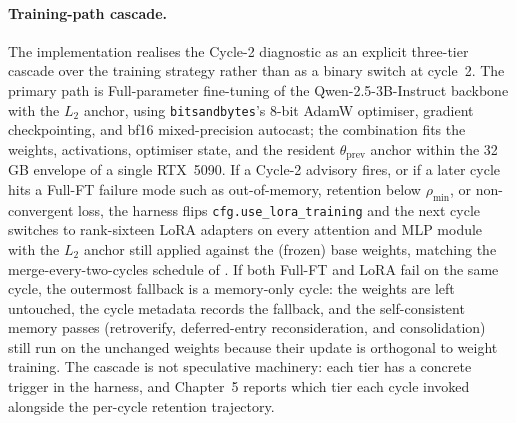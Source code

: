\paragraph{Training-path cascade.}
The implementation realises the Cycle-2 diagnostic as an explicit three-tier cascade over the training strategy rather than as a binary switch at cycle~2. The primary path is Full-parameter fine-tuning of the Qwen-2.5-3B-Instruct backbone with the $L_{2}$ anchor, using \texttt{bitsandbytes}'s 8-bit AdamW optimiser, gradient checkpointing, and bf16 mixed-precision autocast; the combination fits the weights, activations, optimiser state, and the resident $\theta_{\text{prev}}$ anchor within the 32\,GB envelope of a single RTX~5090. If a Cycle-2 advisory fires, or if a later cycle hits a Full-FT failure mode such as out-of-memory, retention below $\rho_{\min}$, or non-convergent loss, the harness flips \texttt{cfg.use\_lora\_training} and the next cycle switches to rank-sixteen LoRA adapters on every attention and MLP module with the $L_{2}$ anchor still applied against the (frozen) base weights, matching the merge-every-two-cycles schedule of \citet{wang2023olora,biderman2024lora}. If both Full-FT and LoRA fail on the same cycle, the outermost fallback is a memory-only cycle: the weights are left untouched, the cycle metadata records the fallback, and the self-consistent memory passes (retroverify, deferred-entry reconsideration, and consolidation) still run on the unchanged weights because their update is orthogonal to weight training. The cascade is not speculative machinery: each tier has a concrete trigger in the harness, and Chapter~5 reports which tier each cycle invoked alongside the per-cycle retention trajectory.

